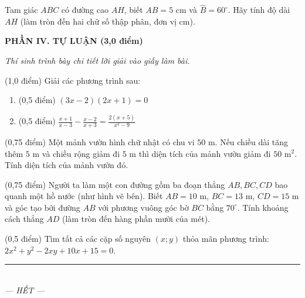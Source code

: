 \documentclass[12pt,a4paper]{article}
\begin{document}
\begin{ex}
Tam giác $ABC$ có đường cao $AH$, biết $AB = 5\text{ cm}$ và $\widehat{B} = 60^\circ$. Hãy tính độ dài $AH$ (làm tròn đến hai chữ số thập phân, đơn vị cm). 
\end{ex}


\setcounter{ex}{0}
\noindent\textbf{\large PHẦN IV. TỰ LUẬN (3,0 điểm)}

\textit{Thí sinh trình bày chi tiết lời giải vào giấy làm bài.}

\vspace{1mm}
\begin{ex} (1,0 điểm)
Giải các phương trình sau:
\begin{enumerate}[label=\textbf{\alph*)}, leftmargin=0.8cm, itemsep=2pt]
\item (0,5 điểm) $(3x - 2)(2x + 1) = 0$
\item (0,5 điểm) $\frac{x + 1}{x - 3} - \frac{x - 2}{x + 3} = \frac{2(x + 5)}{x^2 - 9}$
\end{enumerate}
\end{ex}
\vspace{0.5mm}

\begin{ex} (0,75 điểm)
Một mảnh vườn hình chữ nhật có chu vi $50\text{ m}$. Nếu chiều dài tăng thêm $5\text{ m}$ và chiều rộng giảm đi $5\text{ m}$ thì diện tích của mảnh vườn giảm đi $50\text{ m}^2$. Tính diện tích của mảnh vườn đó.
\end{ex}
\vspace{0.5mm}

\begin{ex} (0,75 điểm)
Người ta làm một con đường gồm ba đoạn thẳng $AB, BC, CD$ bao quanh một hồ nước (như hình vẽ bên). Biết $AB = 10\text{ m}$, $BC = 13\text{ m}$, $CD = 15\text{ m}$ và góc tạo bởi đường $AB$ với phương vuông góc bờ $BC$ bằng $70^\circ$. Tính khoảng cách thẳng $AD$ (làm tròn đến hàng phần mười của mét).
\begin{center}
\end{center}
\end{ex}
\vspace{0.5mm}

\begin{ex} (0,5 điểm)
Tìm tất cả các cặp số nguyên $(x; y)$ thỏa mãn phương trình: $2x^2 + y^2 - 2xy + 10x + 15 = 0$.
\end{ex}
\vspace{0.5mm}


\enlargethispage{1.5cm}
\begin{center}
\rule{4cm}{0.4pt}\\
\textit{--- HẾT ---}
\end{center}
\end{document}
